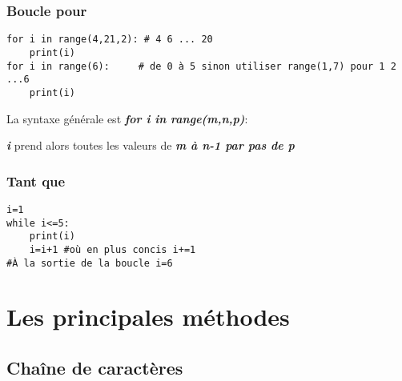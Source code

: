 \documentclass[10pt,dvipsnames,  dvips]{article}
\begin{document}
\subsubsection*{Boucle pour}

\begin{lstlisting}
for i in range(4,21,2): # 4 6 ... 20
	print(i)
for i in range(6):     # de 0 à 5 sinon utiliser range(1,7) pour 1 2 ...6
	print(i)
\end{lstlisting}

La syntaxe générale est \textbf{\textit{for i in range(m,n,p)}}:

\textbf{\textit{i}} prend alors toutes les valeurs de \textbf{\textit{m à n-1 par pas de p}}

\subsubsection*{Tant que}

\begin{lstlisting}
i=1
while i<=5:
	print(i)
	i=i+1 #où en plus concis i+=1
#À la sortie de la boucle i=6
\end{lstlisting}


\newpage
\section{Les principales méthodes}
\subsection{Chaîne de caractères}
\end{document}
